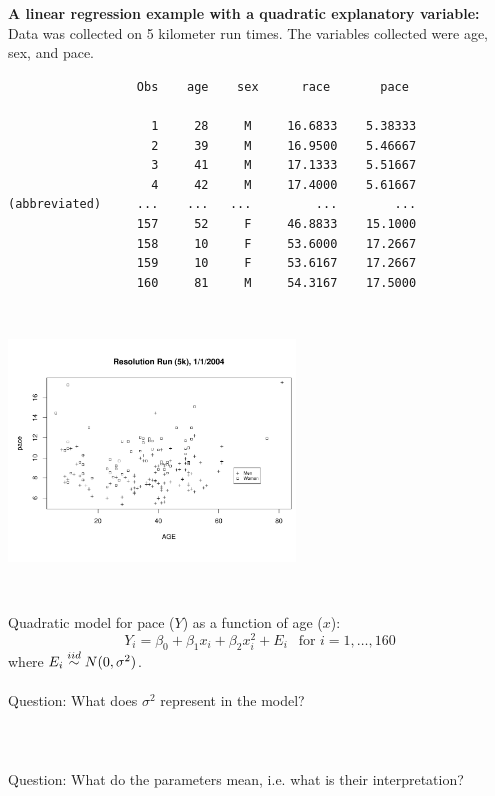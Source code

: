 \newpage

\textbf{A linear regression example with a quadratic explanatory variable:}\\
Data was collected on 5 kilometer run times.  The variables collected were age, sex, and pace.\\
\begin{small}
\begin{verbatim}
                  Obs    age    sex      race       pace

                    1     28     M     16.6833    5.38333
                    2     39     M     16.9500    5.46667
                    3     41     M     17.1333    5.51667
                    4     42     M     17.4000    5.61667
(abbreviated)     ...    ...   ...         ...        ...
                  157     52     F     46.8833    15.1000
                  158     10     F     53.6000    17.2667
                  159     10     F     53.6167    17.2667
                  160     81     M     54.3167    17.5000

\end{verbatim}
\end{small}

\begin{center}
\includegraphics[height=3in,width=3in]{res5k_nomodel}
\end{center}

Quadratic model for pace ($Y$) as a function of age ($x$):
$$ Y_i = \beta_0 + \beta_1 x_i + \beta_2 x_i^2 + E_i \ \ \mbox{ for }i=1,\ldots,160$$
where $E_i \stackrel{iid}{\sim} N(0,\sigma^2)$.\\~\\
Question: What does $\sigma^2$ represent in the model?\\~\\~\\~\\
Question: What do the parameters mean, i.e. what is their interpretation?

